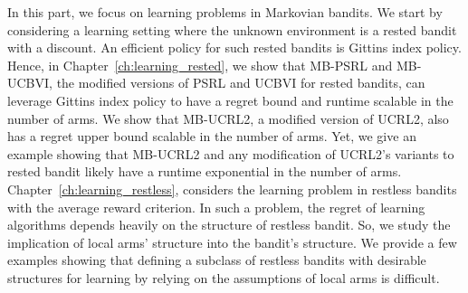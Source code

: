 \documentclass[%
    paper=A4,              %
    twoside=true,          %
    openright,             %
    parskip=half,          %
    chapterprefix=true,    %
    11pt,                  %
    headings=normal,       %
    bibliography=totoc,    %
    listof=totoc,          %
    titlepage=on,          %
    captions=tableabove,   %
    chapterprefix=false,   %
    appendixprefix=false,  %
    draft=false,           %
]{scrreprt}
\newcommand{\KK}[1]{\todo[color=green!10,author=\textbf{\small KK},inline]{\small #1\\}}
\begin{document}
In this part, we focus on learning problems in Markovian bandits. We start by considering a learning setting where the unknown environment is a rested bandit with a discount. An efficient policy for such rested bandits is Gittins index policy. Hence, in Chapter~\ref{ch:learning_rested}, we show that MB-PSRL and MB-UCBVI, the modified versions of PSRL and UCBVI for rested bandits, can leverage Gittins index policy to have a regret bound and runtime scalable in the number of arms. We show that MB-UCRL2, a modified version of UCRL2, also has a regret upper bound scalable in the number of arms. Yet, we give an example showing that MB-UCRL2 and any modification of UCRL2’s variants to rested bandit likely have a runtime exponential in the number of arms. Chapter~\ref{ch:learning_restless}, considers the learning problem in restless bandits with the average reward criterion. In such a problem, the regret of learning algorithms depends heavily on the structure of restless bandit. So, we study the implication of local arms' structure into the bandit's structure. We provide a few examples showing that defining a subclass of restless bandits with desirable structures for learning by relying on the assumptions of local arms is difficult.

\cleardoublepage %
\clearpage
\fi









\iftotalcompilation
%
\fi
%
\end{document}
